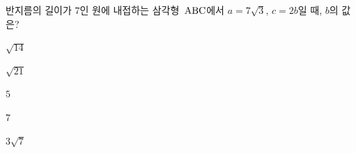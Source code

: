 반지름의 길이가 $7$인 원에 내접하는 삼각형~$\mathrm{ABC}$에서 $a=7\sqrt{3}$, $c=2b$일 때, $b$의 값은? 
\begin{choices32}{\rule[-3ex]{0pt}{8ex}$\sqrt{14}$}{\rule[-3ex]{0pt}{8ex}$\sqrt{21}$}{\rule[-3ex]{0pt}{8ex}$5$}{\rule[-3ex]{0pt}{8ex}$7$}{\rule[-3ex]{0pt}{8ex}$3\sqrt{7}$}\end{choices32}
